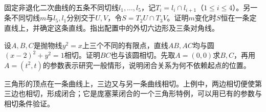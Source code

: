 \par\addvspace{6pt}
\noindent\begin{minipage}{\linewidth}
\begin{example}\label{ex:quadratic-moving-brianchon}
固定非退化二次曲线的五条不同切线\(l_1,\ldots,l_5\)，记\(T_i=l_i\cap l_{i+1}\)（\(1\le i\le4\)）。另一条不同切线\(m\)与\(l_5,l_1\)分别交于\(U,V\)，令\(S=T_2U\cap T_3V\)。证明\(m\)变化时\(S\)恒在一条定直线上，并确定这条直线。指出配置中的外切六边形及三条对角线。
\end{example}
\end{minipage}\par\addvspace{6pt}

\par\addvspace{6pt}
\noindent\begin{minipage}{\linewidth}
\begin{example}\label{ex:quadratic-poncelet-triangle}
设\(A,B,C\)是抛物线\(y^2=x\)上三个不同的有限点，直线\(AB,AC\)均与圆\((x-2)^2+y^2=1\)相切。证明\(BC\)也与该圆相切。先取\(A=(0,0)\)求\(B,C\)，再用\(A=(t^2,t)\)的参数表示研究一般情形，说明闭合关系为何不依赖起点的位置。
\end{example}
\end{minipage}\par\addvspace{6pt}

三角形的顶点在一条曲线上，三边又与另一条曲线相切。上例中，两边相切便使第三边也相切，形成闭合；它是庞塞莱闭合的一个三角形特例，可以用已有的参数与相切条件验证。


